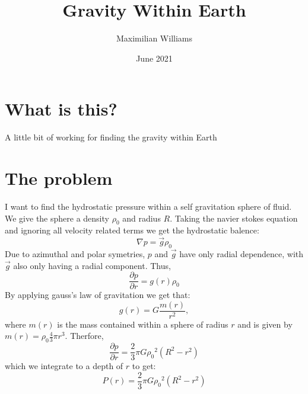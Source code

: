 \documentclass{article}
\title{Gravity Within Earth}
\author{Maximilian Williams}
\date{June 2021}
\begin{document}
\maketitle

\section*{What is this?}
A little bit of working for finding the gravity within Earth

\section*{The problem}
I want to find the hydrostatic pressure within a self gravitation sphere of fluid. We give the sphere a density $\rho_0$ and radius $R$. Taking the navier stokes equation and ignoring all velocity related terms we get the hydrostatic balence:
\begin{equation}
	\nabla p = \vec{g} \rho_0
\end{equation}
Due to azimuthal and polar symetries, $p$ and $\vec{g}$ have only radial dependence, with $\vec{g}$ also only having a radial component. Thus,
\begin{equation}
	\frac{\partial p}{\partial r} = g(r) \rho_0
\end{equation}
By applying gauss's law of gravitation we get that:
\begin{equation}
	g(r) = G \frac{m(r)}{r^2},
\end{equation}
where $m(r)$ is the mass contained within a sphere of radius $r$ and is given by $m(r) = \rho_0 \frac{4}{3} \pi r^3$. Therfore, 
\begin{equation}
	\frac{\partial p}{\partial r} = \frac{2}{3} \pi G {\rho_0}^2 (R^2 - r^2)
\end{equation}
which we integrate to a depth of $r$ to get:
\begin{equation}
	P(r) = \frac{2}{3} \pi G {\rho_0}^2 (R^2 - r^2)
\end{equation}
\end{document}
